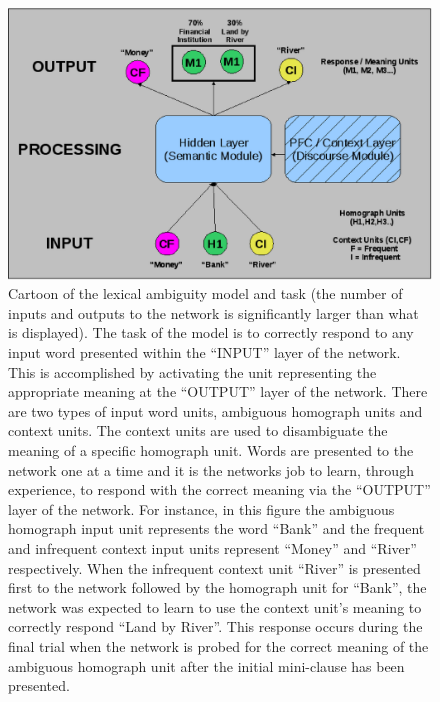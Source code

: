 \documentclass[man]{apa}
\begin{document}
\begin{figure}[tp]
\begin{center}
	\includegraphics[width=115mm]{figures/lexAmb_network_cartoon.eps}
\end{center}
\caption{Cartoon of the lexical ambiguity model and task (the number of inputs and outputs to the network is significantly larger than what is displayed).  The task of the model is to correctly respond to any input word presented within the ``INPUT'' layer of the network.  This is accomplished by activating the unit representing the appropriate meaning at the ``OUTPUT'' layer of the network.  There are two types of input word units, ambiguous homograph units and context units. The context units are used to disambiguate the meaning of a specific homograph unit.  Words are presented to the network one at a time and it is the networks job to learn, through experience, to respond with the correct meaning via the ``OUTPUT'' layer of the network.  For instance, in this figure the ambiguous homograph input unit represents the word ``Bank'' and the frequent and infrequent context input units represent ``Money'' and ``River'' respectively.  When the infrequent context unit ``River'' is presented first to the network followed by the homograph unit for ``Bank'', the network was expected to learn to use the context unit's meaning to correctly respond ``Land by River''.  This response occurs during the final trial when the network is probed for the correct meaning of the ambiguous homograph unit after the initial mini-clause has been presented.}
\label{lexamb-model-task}
\end{figure} 
\end{document}
